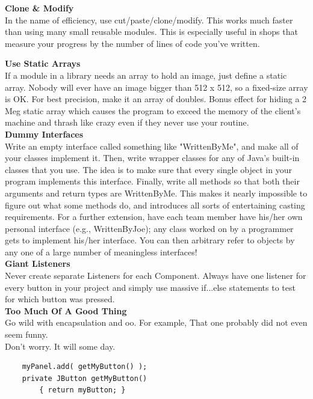 \documentclass[11pt,twoside,a4paper]{article}
\begin{document}
\textbf{Clone \& Modify}~\\
In the name of efficiency, use cut/paste/clone/modify. This works much faster than using many small reusable modules. This is especially useful in shops that measure your progress by the number of lines of code you've written.~\\ 

\clearpage

\textbf{Use Static Arrays}~\\
If a module in a library needs an array to hold an image, just define a static array. Nobody will ever have an image bigger than 512 x 512, so a fixed-size array is OK. For best precision, make it an array of doubles. Bonus effect for hiding a 2 Meg static array which causes the program to exceed the memory of the client's machine and thrash like crazy even if they never use your routine.~\\ 

\textbf{Dummy Interfaces}~\\
Write an empty interface called something like "WrittenByMe", and make all of your classes implement it. Then, write wrapper classes for any of Java's built-in classes that you use. The idea is to make sure that every single object in your program implements this interface. Finally, write all methods so that both their arguments and return types are WrittenByMe. This makes it nearly impossible to figure out what some methods do, and introduces all sorts of entertaining casting requirements. For a further extension, have each team member have his/her own personal interface (e.g., WrittenByJoe); any class worked on by a programmer gets to implement his/her interface. You can then arbitrary refer to objects by any one of a large number of meaningless interfaces!~\\ 

\textbf{Giant Listeners}~\\
Never create separate Listeners for each Component. Always have one listener for every button in your project and simply use massive if...else statements to test for which button was pressed.~\\ 

\textbf{Too Much Of A Good Thing~\texttrademark}~\\
Go wild with encapsulation and oo. For example, That one probably did not even seem funny.~\\Don't worry. It will some day.
\begin{verbatim}
	myPanel.add( getMyButton() ); 
	private JButton getMyButton() 
		{ return myButton; } 
\end{verbatim}
\end{document}
